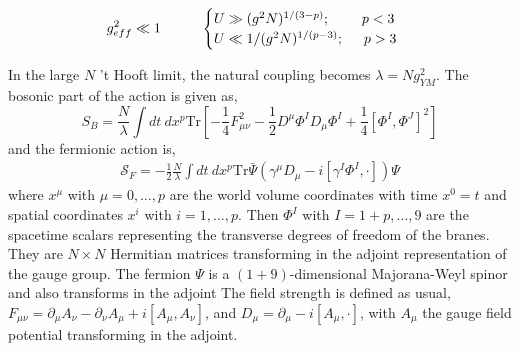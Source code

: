 \begin{equation}
 g^2_{eff} \ll 1 \hspace{10mm} \begin{cases}
     U\gg (g^2 N)^{1/(3-p)} ; \hspace{8mm}p<3     \\
    U \ll 1/(g^2 N)^{1/(p-3)} ; \hspace{5mm} p>3  
      \end{cases}
    \end{equation} 



In the large $N$ 't Hooft limit, the natural coupling becomes $ \lambda = N g_{YM}^{2}$. The bosonic part of the action is given as,
\begin{equation}
S_{B} = \frac{N}{\lambda}  \int dt ~ dx^p \mathrm{Tr}\left[  - \frac{1}{4} F_{\mu\nu}^2 - \frac{1}{2} D^\mu \Phi^I D_\mu \Phi^I + \frac{1}{4} \left[ \Phi^I , \Phi^J \right]^2  \right]
\end{equation}
and the fermionic action is,
\begin{eqnarray}
\mathcal{S}_{F} = -\frac{1}{2} \frac{N}{\lambda} \int dt ~ dx^p \mathrm{Tr} \bar{\Psi} \left( \gamma^\mu D_\mu - i  \left[ \gamma^I \Phi^I , \cdot \right] \right) \Psi
\end{eqnarray}
where $x^\mu$ with $\mu = 0, \ldots, p$ are the world volume coordinates with time $x^0 = t$ and 
spatial coordinates $x^i$ with $i=1,\ldots,p$. Then $\Phi^I$ with $I = 1+p, \ldots, 9$ are the spacetime 
scalars representing the transverse degrees of freedom of the branes. They are $N \times N$ Hermitian 
matrices transforming in the adjoint representation of the gauge group. The fermion $\Psi$ is a $(1+9)$-dimensional 
Majorana-Weyl spinor and also transforms in the adjoint 
The field strength is defined as usual, $F_{\mu\nu} = \partial_\mu A_\nu - \partial_\nu A_\mu + i [ A_\mu , A_\nu ]$, and $D_\mu = \partial_\mu - i [ A_\mu, \cdot]$, with $A_\mu$ 
the gauge field potential transforming in the adjoint. 

